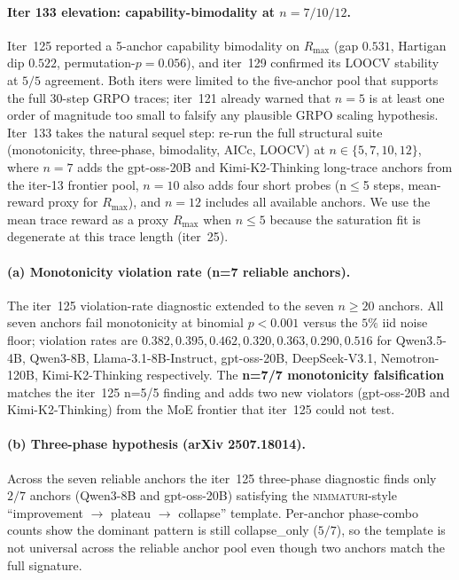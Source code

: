 \documentclass{article}
\begin{document}
\paragraph{Iter 133 elevation: capability-bimodality at $n = 7 / 10 / 12$.}
\label{par:scaling-iter133}
Iter~125 reported a 5-anchor capability bimodality on $R_{\max}$ (gap
$0.531$, Hartigan dip $0.522$, permutation-$p = 0.056$), and iter~129
confirmed its LOOCV stability at $5/5$ agreement.  Both iters were
limited to the five-anchor pool that supports the full 30-step GRPO
traces; iter~121 already warned that $n = 5$ is at least one order of
magnitude too small to falsify any plausible GRPO scaling hypothesis.
Iter~133 takes the natural sequel step: re-run the full structural
suite (monotonicity, three-phase, bimodality, AICc, LOOCV) at
$n \in \{5, 7, 10, 12\}$, where $n = 7$ adds the gpt-oss-20B and
Kimi-K2-Thinking long-trace anchors from the iter-13 frontier pool,
$n = 10$ also adds four short probes (n$\le$5 steps, mean-reward
proxy for $R_{\max}$), and $n = 12$ includes all available anchors.
We use the mean trace reward as a proxy $R_{\max}$ when $n \le 5$
because the saturation fit is degenerate at this trace length
(iter~25).

\paragraph{(a) Monotonicity violation rate (n=7 reliable anchors).}
\label{par:scaling-iter133-mono}
The iter~125 violation-rate diagnostic extended to the seven
$n \ge 20$ anchors.  All seven anchors fail monotonicity at
binomial $p < 0.001$ versus the $5\%$ iid noise floor; violation
rates are $0.382, 0.395, 0.462, 0.320, 0.363, 0.290, 0.516$ for
Qwen3.5-4B, Qwen3-8B, Llama-3.1-8B-Instruct, gpt-oss-20B,
DeepSeek-V3.1, Nemotron-120B, Kimi-K2-Thinking respectively.  The
\textbf{n=7/7 monotonicity falsification} matches the iter~125
n=5/5 finding and adds two new violators (gpt-oss-20B and
Kimi-K2-Thinking) from the MoE frontier that iter~125 could not
test.

\paragraph{(b) Three-phase hypothesis (arXiv 2507.18014).}
\label{par:scaling-iter133-tp}
Across the seven reliable anchors the iter~125 three-phase
diagnostic finds only $2/7$ anchors (Qwen3-8B and gpt-oss-20B)
satisfying the \textsc{nimmaturi}-style ``improvement $\to$ plateau
$\to$ collapse'' template.  Per-anchor phase-combo counts show the
dominant pattern is still collapse_only ($5/7$), so the template is
not universal across the reliable anchor pool even though two anchors
match the full signature.
\end{document}
